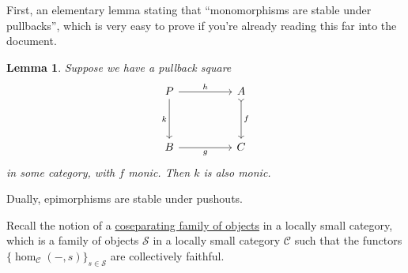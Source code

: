 \documentclass[a4paper,11pt]{article}
\theoremstyle{break_italics}
\newtheorem*{lemma*}{Lemma}
\theoremstyle{break_upright}
\theoremstyle{remark}
\newcommand{\C}{\mathcal{C}}
\begin{document}
First, an elementary lemma stating that ``monomorphisms are stable under pullbacks'', which is very easy to prove if you're already reading this far into the document.

\begin{lemma*}
Suppose we have a pullback square
\[
\begin{tikzcd}
P \arrow[rr, "h"] \arrow[dd, "k"'] &  & A \arrow[dd, "f", tail] \\
                                   &  &                         \\
B \arrow[rr, "g"']                 &  & C                      
\end{tikzcd}
\]
in some category, with $f$ monic. Then $k$ is also monic.
\end{lemma*}

Dually, epimorphisms are stable under pushouts.

Recall the notion of a \uline{coseparating family of objects} in a locally small category, which is a family of objects $\mathcal S$ in a locally small category $\C$ such that the functors $\{\hom_\C(-,s)\}_{s\in\mathcal S}$ are collectively faithful.
\end{document}
